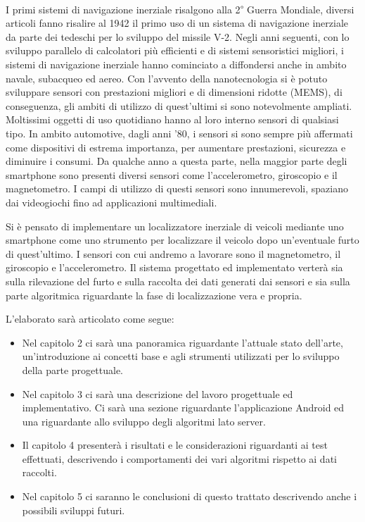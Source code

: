 \documentclass[12pt,a4paper,openright,twoside]{report}
\begin{document}
I primi sistemi di navigazione inerziale risalgono alla 2\textsuperscript{$\circ$} Guerra Mondiale, diversi articoli \cite{K20} fanno risalire al 1942 il primo uso di un sistema di navigazione inerziale da parte dei tedeschi per lo sviluppo del missile V-2. Negli anni seguenti, con lo sviluppo parallelo di calcolatori più efficienti e di sistemi sensoristici migliori, i sistemi di navigazione inerziale hanno cominciato a diffondersi anche in ambito navale, subacqueo ed aereo. Con l'avvento della nanotecnologia si è potuto sviluppare sensori con prestazioni migliori e di dimensioni ridotte (MEMS), di conseguenza, gli ambiti di utilizzo di quest'ultimi si sono notevolmente ampliati. 
Moltissimi oggetti di uso quotidiano hanno al loro interno sensori di qualsiasi tipo. In ambito automotive, dagli anni '80, i sensori si sono sempre più affermati come dispositivi di estrema importanza, per aumentare prestazioni, sicurezza e diminuire i consumi. 
Da qualche anno a questa parte, nella maggior parte degli smartphone sono presenti diversi sensori come l'accelerometro, giroscopio e il magnetometro. I campi di utilizzo di questi sensori sono innumerevoli, spaziano dai videogiochi fino ad applicazioni multimediali.

Si è pensato di implementare un localizzatore inerziale di veicoli mediante uno smartphone come uno strumento per localizzare il veicolo dopo un'eventuale furto di quest'ultimo. I sensori con cui andremo a lavorare sono il magnetometro, il giroscopio e l'accelerometro. Il sistema progettato ed implementato verterà sia sulla rilevazione del furto e sulla raccolta dei dati generati dai sensori e sia sulla parte algoritmica riguardante la fase di localizzazione vera e propria.

L'elaborato sarà articolato come segue:

\begin{itemize}
\item Nel capitolo 2 ci sarà una panoramica riguardante l'attuale stato dell'arte, un'introduzione ai concetti base e agli strumenti utilizzati per lo sviluppo della parte progettuale.
\item Nel capitolo 3 ci sarà una descrizione del lavoro progettuale ed implementativo. Ci sarà una sezione riguardante l'applicazione Android ed una riguardante allo sviluppo degli algoritmi lato server.
\item Il capitolo 4 presenterà i risultati e le considerazioni riguardanti ai test effettuati, descrivendo i comportamenti dei vari algoritmi rispetto ai dati raccolti.
\item Nel capitolo 5 ci saranno le conclusioni di questo trattato descrivendo anche i possibili sviluppi futuri.
\end{itemize}
\end{document}
